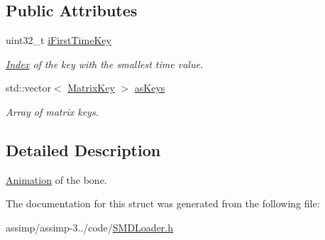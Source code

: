 \subsection*{Public Attributes}
\begin{DoxyCompactItemize}
\item 
\hypertarget{struct_assimp_1_1_s_m_d_1_1_bone_1_1_animation_a5760181f4af1a34f2e688f0ae54b4c91}{uint32\+\_\+t \hyperlink{struct_assimp_1_1_s_m_d_1_1_bone_1_1_animation_a5760181f4af1a34f2e688f0ae54b4c91}{i\+First\+Time\+Key}}\label{struct_assimp_1_1_s_m_d_1_1_bone_1_1_animation_a5760181f4af1a34f2e688f0ae54b4c91}

\begin{DoxyCompactList}\small\item\em \hyperlink{struct_index}{Index} of the key with the smallest time value. \end{DoxyCompactList}\item 
\hypertarget{struct_assimp_1_1_s_m_d_1_1_bone_1_1_animation_a45c67e4126d4f50273c74fb5408219a5}{std\+::vector$<$ \hyperlink{struct_assimp_1_1_s_m_d_1_1_bone_1_1_animation_1_1_matrix_key}{Matrix\+Key} $>$ \hyperlink{struct_assimp_1_1_s_m_d_1_1_bone_1_1_animation_a45c67e4126d4f50273c74fb5408219a5}{as\+Keys}}\label{struct_assimp_1_1_s_m_d_1_1_bone_1_1_animation_a45c67e4126d4f50273c74fb5408219a5}

\begin{DoxyCompactList}\small\item\em Array of matrix keys. \end{DoxyCompactList}\end{DoxyCompactItemize}


\subsection{Detailed Description}
\hyperlink{struct_assimp_1_1_s_m_d_1_1_bone_1_1_animation}{Animation} of the bone. 

The documentation for this struct was generated from the following file\+:\begin{DoxyCompactItemize}
\item 
assimp/assimp-\/3../code/\hyperlink{_s_m_d_loader_8h}{S\+M\+D\+Loader.\+h}\end{DoxyCompactItemize}

